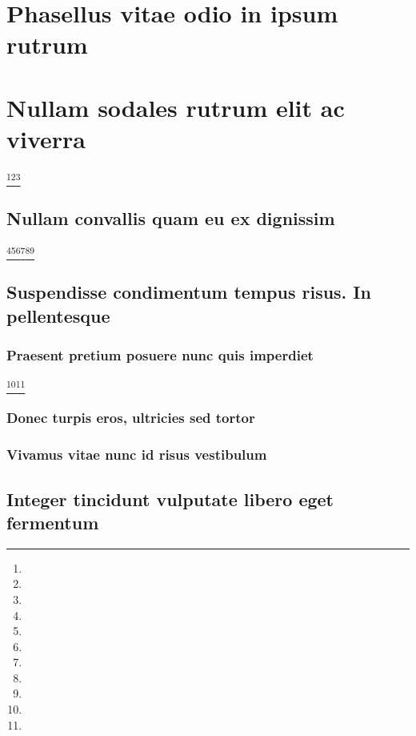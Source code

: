 \documentclass[%
  german,%
  exercise,%
  oneside,%
]{iswartcl}
\begin{document}
\lipsum[1-8]

\section{Phasellus vitae odio in ipsum rutrum}

\lipsum[1-8]

\section{Nullam sodales rutrum elit ac viverra}

\lipsum[1-8]\footnote{\lipsum[1]}\footnote{\lipsum[1]}\footnote{\lipsum[1]}

\subsection{Nullam convallis quam eu ex dignissim}

\lipsum[1-8]\footnote{\lipsum[1]}\footnote{\lipsum[1]}\footnote{\lipsum[1]}\footnote{\lipsum[1]}\footnote{\lipsum[1]}\footnote{\lipsum[1]}

\subsection{Suspendisse condimentum tempus risus. In pellentesque}

\lipsum[1-8]

\subsubsection{Praesent pretium posuere nunc quis imperdiet}

\lipsum[1-8]\footnote{\lipsum[1]}\footnote{\lipsum[1]}

\subsubsection{Donec turpis eros, ultricies sed tortor}

\lipsum[1-8]

\subsubsection{Vivamus vitae nunc id risus vestibulum}

\lipsum[1-8]

\subsection{Integer tincidunt vulputate libero eget fermentum}
\end{document}
